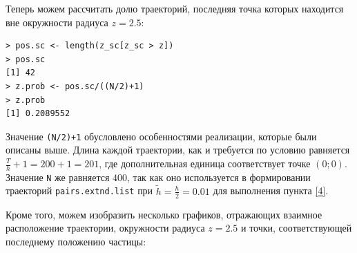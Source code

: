 \documentclass[14pt,a4paper]{scrartcl}
\begin{document}
Теперь можем рассчитать долю траекторий, последняя точка которых находится вне окружности радиуса $z = 2.5$:
\begin{verbatim}
> pos.sc <- length(z_sc[z_sc > z])
> pos.sc
[1] 42
> z.prob <- pos.sc/((N/2)+1)
> z.prob
[1] 0.2089552
\end{verbatim}

Значение \texttt{(N/2)+1} обусловлено особенностями реализации, которые были описаны выше. Длина каждой траектории, как и требуется по условию равняется $\frac{T}{h} + 1 = 200 + 1 = 201$, где дополнительная единица соответствует точке $(0;0)$. Значение \texttt{N} же равняется $400$, так как оно используется в формировании траекторий \texttt{pairs.extnd.list} при $\tilde{h} = \frac{h}{2} = 0.01$ для выполнения пункта \ref{4}.


Кроме того, можем изобразить несколько графиков, отражающих взаимное расположение траектории, окружности радиуса $z = 2.5$ и точки, соответствующей последнему положению частицы:
\end{document}
